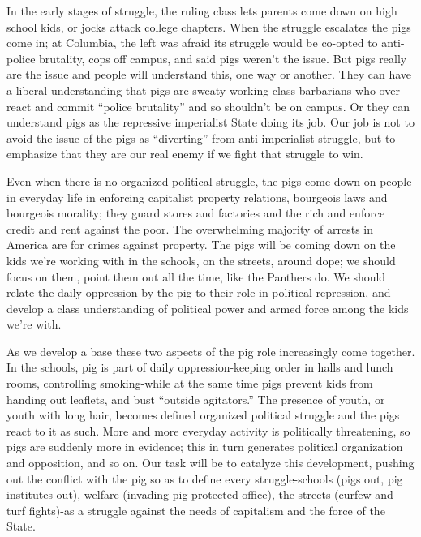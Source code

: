 \documentclass[12pt, titlepage]{article}
\begin{document}
{\begin{spacing}{1.10}
In the early stages of struggle, the ruling class lets parents come down on high school kids, or jocks attack college chapters. When the struggle escalates the pigs come in; at Columbia, the left was afraid its struggle would be co-opted to anti-police brutality, cops off campus, and said pigs weren't the issue. But pigs really are the issue and people will understand this, one way or another. They can have a liberal understanding that pigs are sweaty working-class barbarians who over-react and commit ``police brutality'' and so shouldn't be on campus. Or they can understand pigs as the repressive imperialist State doing its job. Our job is not to avoid the issue of the pigs as ``diverting'' from anti-imperialist struggle, but to emphasize that they are our real enemy if we fight that struggle to win.

Even when there is no organized political struggle, the pigs come down on people in everyday life in enforcing capitalist property relations, bourgeois laws and bourgeois morality; they guard stores and factories and the rich and enforce credit and rent against the poor. The overwhelming majority of arrests in America are for crimes against property. The pigs will be coming down on the kids we're working with in the schools, on the streets, around dope; we should focus on them, point them out all the time, like the Panthers do. We should relate the daily oppression by the pig to their role in political repression, and develop a class understanding of political power and armed force among the kids we're with.

As we develop a base these two aspects of the pig role increasingly come together. In the schools, pig is part of daily oppression-keeping order in halls and lunch rooms, controlling smoking-while at the same time pigs prevent kids from handing out leaflets, and bust ``outside agitators.'' The presence of youth, or youth with long hair, becomes defined organized political struggle and the pigs react to it as such. More and more everyday activity is politically threatening, so pigs are suddenly more in evidence; this in turn generates political organization and opposition, and so on. Our task will be to catalyze this development, pushing out the conflict with the pig so as to define every struggle-schools (pigs out, pig institutes out), welfare (invading pig-protected office), the streets (curfew and turf fights)-as a struggle against the needs of capitalism and the force of the State.


\end{spacing}}
\end{document}
